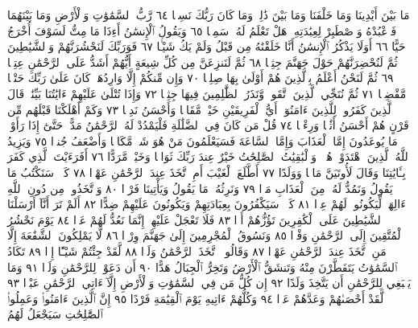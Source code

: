 مَا بَيْنَ أَيْدِينَا وَمَا خَلْفَنَا وَمَا بَيْنَ ذَٰلِكَۚ وَمَا كَانَ رَبُّكَ نَسِيࣰّا ٦٤
رَّبُّ ٱلسَّمَٰوَٰتِ وَٱلْأَرْضِ وَمَا بَيْنَهُمَا فَٱعْبُدْهُ وَٱصْطَبِرْ لِعِبَٰدَتِهِۦۚ
هَلْ تَعْلَمُ لَهُۥ سَمِيࣰّا ٦٥ وَيَقُولُ ٱلْإِنسَٰنُ أَءِذَا مَا مِتُّ لَسَوْفَ
أُخْرَجُ حَيًّا ٦٦ أَوَلَا يَذْكُرُ ٱلْإِنسَٰنُ أَنَّا خَلَقْنَٰهُ مِن قَبْلُ
وَلَمْ يَكُ شَيْـࣰٔا ٦٧ فَوَرَبِّكَ لَنَحْشُرَنَّهُمْ وَٱلشَّيَٰطِينَ ثُمَّ
لَنُحْضِرَنَّهُمْ حَوْلَ جَهَنَّمَ جِثِيࣰّا ٦٨ ثُمَّ لَنَنزِعَنَّ مِن كُلِّ
شِيعَةٍ أَيُّهُمْ أَشَدُّ عَلَى ٱلرَّحْمَٰنِ عِتِيࣰّا ٦٩ ثُمَّ لَنَحْنُ أَعْلَمُ بِٱلَّذِينَ
هُمْ أَوْلَىٰ بِهَا صِلِيࣰّا ٧٠ وَإِن مِّنكُمْ إِلَّا وَارِدُهَاۚ كَانَ عَلَىٰ رَبِّكَ
حَتْمࣰا مَّقْضِيࣰّا ٧١ ثُمَّ نُنَجِّي ٱلَّذِينَ ٱتَّقَوا۟ وَّنَذَرُ ٱلظَّٰلِمِينَ
فِيهَا جِثِيࣰّا ٧٢ وَإِذَا تُتْلَىٰ عَلَيْهِمْ ءَايَٰتُنَا بَيِّنَٰتࣲ قَالَ ٱلَّذِينَ كَفَرُوا۟
لِلَّذِينَ ءَامَنُوٓا۟ أَيُّ ٱلْفَرِيقَيْنِ خَيْرࣱ مَّقَامࣰا وَأَحْسَنُ نَدِيࣰّا ٧٣
وَكَمْ أَهْلَكْنَا قَبْلَهُم مِّن قَرْنٍ هُمْ أَحْسَنُ أَثَٰثࣰا وَرِءْيࣰا ٧٤
قُلْ مَن كَانَ فِي ٱلضَّلَٰلَةِ فَلْيَمْدُدْ لَهُ ٱلرَّحْمَٰنُ مَدًّاۚ حَتَّىٰٓ إِذَا رَأَوْا۟
مَا يُوعَدُونَ إِمَّا ٱلْعَذَابَ وَإِمَّا ٱلسَّاعَةَ فَسَيَعْلَمُونَ مَنْ هُوَ شَرࣱّ
مَّكَانࣰا وَأَضْعَفُ جُندࣰا ٧٥ وَيَزِيدُ ٱللَّهُ ٱلَّذِينَ ٱهْتَدَوْا۟ هُدࣰىۗ
وَٱلْبَٰقِيَٰتُ ٱلصَّٰلِحَٰتُ خَيْرٌ عِندَ رَبِّكَ ثَوَابࣰا وَخَيْرࣱ مَّرَدًّا ٧٦
أَفَرَءَيْتَ ٱلَّذِي كَفَرَ بِـَٔايَٰتِنَا وَقَالَ لَأُوتَيَنَّ مَالࣰا وَوَلَدًا ٧٧
أَطَّلَعَ ٱلْغَيْبَ أَمِ ٱتَّخَذَ عِندَ ٱلرَّحْمَٰنِ عَهْدࣰا ٧٨ كَلَّاۚ
سَنَكْتُبُ مَا يَقُولُ وَنَمُدُّ لَهُۥ مِنَ ٱلْعَذَابِ مَدࣰّا ٧٩ وَنَرِثُهُۥ
مَا يَقُولُ وَيَأْتِينَا فَرْدࣰا ٨٠ وَٱتَّخَذُوا۟ مِن دُونِ ٱللَّهِ ءَالِهَةࣰ
لِّيَكُونُوا۟ لَهُمْ عِزࣰّا ٨١ كَلَّاۚ سَيَكْفُرُونَ بِعِبَادَتِهِمْ وَيَكُونُونَ
عَلَيْهِمْ ضِدًّا ٨٢ أَلَمْ تَرَ أَنَّآ أَرْسَلْنَا ٱلشَّيَٰطِينَ عَلَى ٱلْكَٰفِرِينَ
تَؤُزُّهُمْ أَزࣰّا ٨٣ فَلَا تَعْجَلْ عَلَيْهِمْۖ إِنَّمَا نَعُدُّ لَهُمْ عَدࣰّا ٨٤
يَوْمَ نَحْشُرُ ٱلْمُتَّقِينَ إِلَى ٱلرَّحْمَٰنِ وَفْدࣰا ٨٥ وَنَسُوقُ ٱلْمُجْرِمِينَ
إِلَىٰ جَهَنَّمَ وِرْدࣰا ٨٦ لَّا يَمْلِكُونَ ٱلشَّفَٰعَةَ إِلَّا مَنِ ٱتَّخَذَ عِندَ
ٱلرَّحْمَٰنِ عَهْدࣰا ٨٧ وَقَالُوا۟ ٱتَّخَذَ ٱلرَّحْمَٰنُ وَلَدࣰا ٨٨ لَّقَدْ
جِئْتُمْ شَيْـًٔا إِدࣰّا ٨٩ تَكَادُ ٱلسَّمَٰوَٰتُ يَتَفَطَّرْنَ مِنْهُ
وَتَنشَقُّ ٱلْأَرْضُ وَتَخِرُّ ٱلْجِبَالُ هَدًّا ٩٠ أَن دَعَوْا۟ لِلرَّحْمَٰنِ وَلَدࣰا ٩١
وَمَا يَنۢبَغِي لِلرَّحْمَٰنِ أَن يَتَّخِذَ وَلَدًا ٩٢ إِن كُلُّ مَن فِي
ٱلسَّمَٰوَٰتِ وَٱلْأَرْضِ إِلَّآ ءَاتِي ٱلرَّحْمَٰنِ عَبْدࣰا ٩٣ لَّقَدْ أَحْصَىٰهُمْ
وَعَدَّهُمْ عَدࣰّا ٩٤ وَكُلُّهُمْ ءَاتِيهِ يَوْمَ ٱلْقِيَٰمَةِ فَرْدًا ٩٥
إِنَّ ٱلَّذِينَ ءَامَنُوا۟ وَعَمِلُوا۟ ٱلصَّٰلِحَٰتِ سَيَجْعَلُ لَهُمُ
